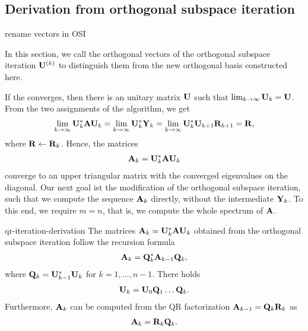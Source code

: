 \subsection{Derivation from orthogonal subspace iteration}

\begin{todo}
  rename vectors in OSI
\end{todo}

\begin{intro}
  \label{par:qr:intro}
  In this section, we call the orthogonal vectors of the orthogonal subspace iteration $\mathbf U^{(k)}$ to distinguish them from the new orthogonal basis constructed here.
  
  If the  converges, then
  there is an unitary matrix $\mathbf U$ such that
  $\lim_{k \to \infty} \mathbf U_k = \mathbf U$.  From the two assignments of
  the algorithm, we get
  \begin{gather}
    \lim_{k \to \infty} \mathbf U_k^* \mathbf A \mathbf U_k = \lim_{k \to \infty} \mathbf U_k^* \mathbf Y_k = \lim_{k \to \infty}
    \mathbf U_k^*\mathbf U_{k+1}\mathbf R_{k+1} = \mathbf R,
  \end{gather}
  where $\mathbf R\leftarrow\mathbf R_k$. Hence, the matrices
  \begin{gather}
    \label{eq:qr:intro:1}
    \mathbf A_k = \mathbf U_k^*\mathbf A\mathbf U_k
  \end{gather}
  converge to an upper triangular matrix with the converged
  eigenvalues on the diagonal. Our next goal ist the modification of
  the orthogonal subspace iteration, such that we compute the sequence
  $\mathbf A_k$ directly, without the intermediate $\mathbf Y_k$. To this end,
  we require $m=n$, that is, we compute the whole spectrum of $\mathbf A$.
\end{intro}

\begin{Lemma}{qr-iteration-derivation}
  The matrices $\mathbf A_k = \mathbf U_k^*\mathbf A\mathbf U_k$ obtained from the
  orthogonal subspace iteration follow the recursion formula
  \begin{gather}
    \label{eq:qr:iteration-derivation:2}
    \mathbf A_k = \mathbf Q_k^*\mathbf A_{k-1}\mathbf Q_k,
  \end{gather}
  where $\mathbf Q_k = \mathbf U_{k-1}^*\mathbf U_k$ for $k=1,\dots,n-1$. There holds
  \begin{gather}
    \label{eq:qr:iteration-derivation:1}
    \mathbf U_k=\mathbf U_0\mathbf Q_1\dots\mathbf Q_k.
  \end{gather}
  Furthermore, $\mathbf A_k$ can be
  computed from the QR factorization $\mathbf A_{k-1}= \mathbf Q_k\mathbf R_k$ as
  \begin{gather}
    \mathbf A_k = \mathbf R_k\mathbf Q_k.
  \end{gather}
\end{Lemma}


